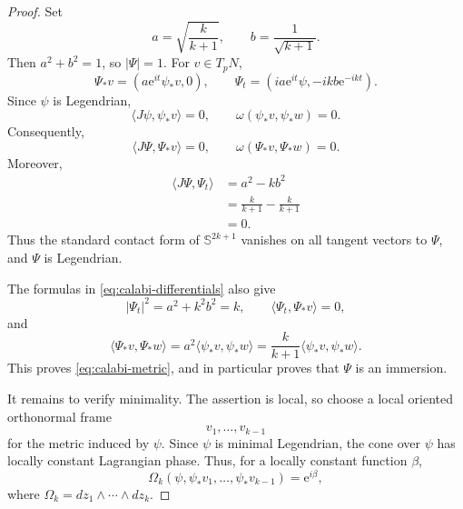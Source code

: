 \documentclass[11pt,a4paper]{article}
\numberwithin{equation}{section}
\newcommand{\Sph}{\mathbb S}
\newcommand{\ee}{\mathrm e}
\begin{document}
\begin{proof}
Set
$$
        a=\sqrt{\frac{k}{k+1}},
        \qquad
        b=\frac1{\sqrt{k+1}}.
$$
Then $a^2+b^2=1$, so $|\Psi|=1$.  For $v\in T_pN$,
\begin{equation}\label{eq:calabi-differentials}
        \Psi_*v=(a\ee^{it}\psi_*v,0),
        \qquad
        \Psi_t=(ia\ee^{it}\psi,-ikb\ee^{-ikt}).
\end{equation}
Since $\psi$ is Legendrian,
$$
        \langle J\psi,\psi_*v\rangle=0,
        \qquad
        \omega(\psi_*v,\psi_*w)=0.
$$
Consequently,
$$
        \langle J\Psi,\Psi_*v\rangle=0,
        \qquad
        \omega(\Psi_*v,\Psi_*w)=0.
$$
Moreover,
$$
\begin{aligned}
        \langle J\Psi,\Psi_t\rangle
        &=a^2-kb^2\\
        &=\frac{k}{k+1}-\frac{k}{k+1}
        \\&=0.
\end{aligned}
$$
Thus the standard contact form of $\Sph^{2k+1}$ vanishes on all tangent vectors to $\Psi$, and $\Psi$ is Legendrian.

The formulas in \eqref{eq:calabi-differentials} also give
$$
        |\Psi_t|^2=a^2+k^2b^2=k,
        \qquad
        \langle\Psi_t,\Psi_*v\rangle=0,
$$
and
$$
        \langle\Psi_*v,\Psi_*w\rangle
        =a^2\langle\psi_*v,\psi_*w\rangle
        =\frac{k}{k+1}\langle\psi_*v,\psi_*w\rangle.
$$
This proves \eqref{eq:calabi-metric}, and in particular proves that $\Psi$ is an immersion.

It remains to verify minimality.  The assertion is local, so choose a local oriented orthonormal frame
$$
        v_1,\ldots,v_{k-1}
$$
for the metric induced by $\psi$.  Since $\psi$ is minimal Legendrian, the cone over $\psi$ has locally constant Lagrangian phase.  Thus, for a locally constant function $\beta$,
\begin{equation}\label{eq:old-link-phase}
        \Omega_k(\psi,\psi_*v_1,\ldots,\psi_*v_{k-1})
        =\ee^{i\beta},
\end{equation}
where $\Omega_k=dz_1\wedge\cdots\wedge dz_k.$


\end{proof}
\end{document}
